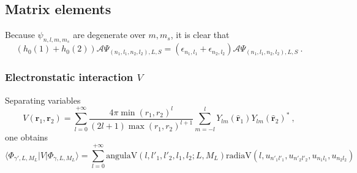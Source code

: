 \documentclass{article}
\renewcommand{\d}{\mathrm{d}}
\begin{document}
\subsection{Matrix elements}\label{sec:mat-elements}
Because $\psi_{n,l,m,m_s}$ are degenerate over $m,m_s$, it is clear that
\begin{equation}
(h_0(1)+h_0(2))\mathcal A \Psi_{(n_1,l_1,n_2,l_2),L,S} = (\epsilon_{n_1,l_1} + \epsilon_{n_2,l_2}) \mathcal A \Psi_{(n_1,l_1,n_2,l_2),L,S}~.
\end{equation}

\subsubsection{Electronstatic interaction $V$}
Separating variables
\begin{equation}
V(\bm{r}_1,\bm{r}_2) = \sum_{l=0}^{+\infty}\frac{4\pi\min(r_1,r_2)^l}{(2l+1)\max(r_1,r_2)^{l+1}}\sum_{m=-l}^{l}Y_{lm}(\bm{\hat r}_1)Y_{lm}(\bm{\hat r}_2)^*~,
\end{equation}
one obtains
\begin{equation}
\langle \Phi_{\gamma',L,M_L} |V| \Phi_{\gamma,L,M_L}\rangle = \sum_{l=0}^{+\infty}\text{angulaV}(l,l'_1,l'_2,l_1,l_2;L,M_L) \text{radiaV}(l,u_{n'_1l'_1},u_{n'_2l'_2},u_{n_1l_1},u_{n_2l_2})
\end{equation}
\end{document}
